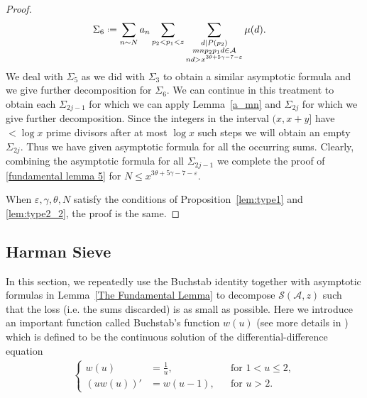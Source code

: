 \documentclass[12pt, reqno, twoside, letterpaper]{amsart}
\numberwithin{equation}{section}
\newcommand{\cA}{\ensuremath{\mathcal{A}}}
\newcommand{\cS}{\ensuremath{\mathcal{S}}}
\theoremstyle{customthm}
\theoremstyle{customrem}
\newcommand*{\defeq}{\mathrel{\vcenter{\baselineskip0.5ex \lineskiplimit0pt
			\hbox{\scriptsize.}\hbox{\scriptsize.}}}%
	=}
\begin{document}
\begin{proof}
\begin{align*}
&\Sigma_6 \defeq \sum_{n \sim N}a_n \sum_{p_2 < p_1 < z} \sum_{\substack{d|P(p_2) \\ mnp_2p_1d \in \cA \\ nd > x^{3\theta+5\gamma-7-\varepsilon}}} \mu(d).
\end{align*}
We deal with $\Sigma_5$ as we did with $\Sigma_3$ to obtain a similar asymptotic formula and we give further decomposition for $\Sigma_6$. We can continue in this treatment to obtain each $\Sigma_{2j-1}$ for which we can apply Lemma~\ref{a_mn} and $\Sigma_{2j}$ for which we give further decomposition. Since the integers in the interval $(x, x+y]$ have $< \log x$ prime divisors after at most $\log x$ such steps we will obtain an empty $\Sigma_{2j}$. Thus we have given asymptotic formula for all the occurring sums. Clearly, combining the asymptotic formula for all $\Sigma_{2j-1}$ we complete the proof of \eqref{fundamental lemma 5} for $N \leqslant x^{3\theta +5\gamma-7 -\varepsilon}$.

When  $\varepsilon, \gamma, \theta, N$ satisfy the conditions of Proposition~\ref{lem:type1} and \ref{lem:type2_2}, the proof is the same. 
\end{proof}

















\subsection{Harman Sieve}\label{Harman sieve}
In this section, we repeatedly use the Buchstab identity together with asymptotic formulas in Lemma~\ref{The Fundamental Lemma} to decompose $\cS(\cA,z)$ such that the loss (i.e. the sums discarded) is as small as possible. Here we introduce an important function called Buchstab’s function $w(u)$ (see more details in \cite[Page~14-17]{Ha}) which is defined to be the continuous solution of the differential-difference equation
\begin{align}\label{buchstab equation}
	\left\{
	\begin{aligned}
		w(u) &= \frac{1}{u}, && \text{for } 1 < u \leqslant 2, \\
		(uw(u))' &= w(u-1), && \text{for } u > 2.
	\end{aligned}
	\right.
\end{align} 
\end{document}
